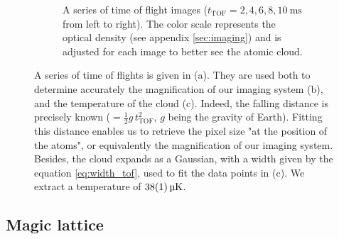 \documentclass[11pt]{article}
\newcommand{\mathsc}[1]{\mathrm{\scriptscriptstyle {#1}}}
\numberwithin{equation}{section}
\numberwithin{figure}{section}
\begin{document}
%
\begin{figure}[t!]
	\centering
	\begin{subfigure}[b]{0.95\textwidth}
    	\centering
    	\small
		
		\vspace{-0.5cm}
		\caption{\small A series of time of flight images ($t_\mathsc{TOF} = 2, 4, 6, 8, \SI{10}{\milli\second}$ from left to right).  The color scale represents the optical density (see appendix \ref{sec:imaging}) and is adjusted for each image to better see the atomic cloud.}
		\label{fig:MOT_im}
	\end{subfigure}	
	\vspace{0.5cm}

	\begin{subfigure}[b]{0.49\textwidth}
		\centering
		\small
		
		\caption{\small }
		\label{fig:MOT_gravity}
	\end{subfigure}
	\begin{subfigure}[b]{0.49\textwidth}
    	\centering
    	\small
		
		\caption{\small }
		\label{fig:MOT_temperature}
	\end{subfigure}	
	\caption{\small A series of time of flights is given in (a). They are used both to determine accurately the magnification of our imaging system (b), and the temperature of the cloud (c). Indeed, the falling distance is precisely known ($= \frac{1}{2} g \, t_\mathsc{TOF}^2$, $g$ being the gravity of Earth). Fitting this distance enables us to retrieve the pixel size "at the position of the atoms", or equivalently the magnification of our imaging system. Besides, the cloud expands as a Gaussian, with a width given by the equation \eqref{eq:width_tof}, used to fit the data points in (c). We extract a temperature of $\SI{38\pm1}{\micro\kelvin}$.}
    \label{fig:MOT}
\end{figure}
%

\subsection{Magic lattice}
\label{sec:lattice}
\end{document}
